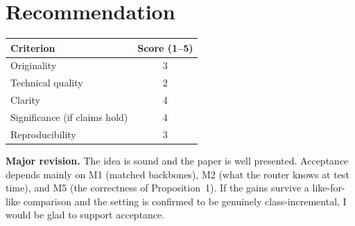 \documentclass[11pt]{article}
\begin{document}
\section{Recommendation}

\begin{table}[h]
  \centering
  \begin{tabular}{@{}lc@{}}
    \toprule
    Criterion & Score (1--5) \\
    \midrule
    Originality & 3 \\
    Technical quality & 2 \\
    Clarity & 4 \\
    Significance (if claims hold) & 4 \\
    Reproducibility & 3 \\
    \bottomrule
  \end{tabular}
\end{table}

\textbf{Major revision.} The idea is sound and the paper is well presented. Acceptance depends mainly on M1 (matched backbones), M2 (what the router knows at test time), and M5 (the correctness of Proposition~1). If the gains survive a like-for-like comparison and the setting is confirmed to be genuinely class-incremental, I would be glad to support acceptance.



\end{document}
